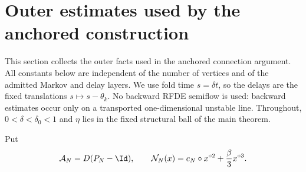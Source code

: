 \section{Outer estimates used by the anchored construction}
\label{sec:anchor-toolkit-outer-estimates}

This section collects the outer facts used in the anchored connection
argument.  All constants below are independent of the number of vertices and
of the admitted Markov and delay layers.  We use fold time \(s=\delta t\), so
the delays are the fixed translations \(s\mapsto s-\theta_k\).  No backward
RFDE semiflow is used: backward estimates occur only on a transported
one-dimensional unstable line.
Throughout, \(0<\delta<\delta_0<1\) and \(\eta\) lies in the fixed structural
ball of the main theorem.

Put
\begin{equation}
 \mathcal A_N=D(P_N-\Id),\qquad
 \mathcal N_N(x)=c_N\circ x^{\circ2}+\frac\beta3x^{\circ3}.
 \label{eq:anchor-toolkit-fast-objects}
\end{equation}

